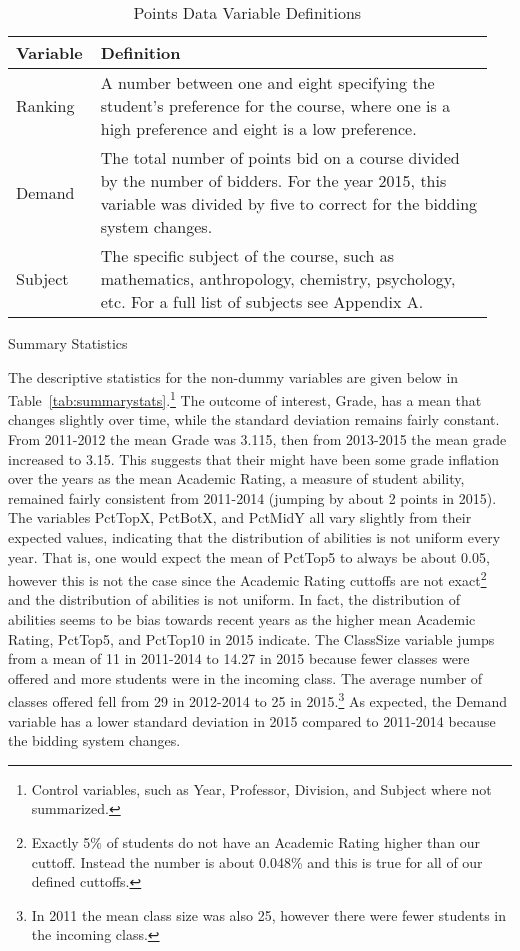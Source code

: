 \documentclass[12pt,a4paper,english,fleqn]{article}
\makeatletter
\newcommand{\tablelabel}[1]{Table~\ref{#1}}
\renewcommand\subsection{\@startsection{subsection}{2}
{\z@}{-3.25ex\@plus -1ex \@minus -.2ex}{1.5ex \@plus .2ex}{\normalfont\bf}}
\makeatother
\begin{document}
\begin{table}[htb]
  \centering
  \caption{Points Data Variable Definitions}\label{tab:def2}
  \begin{tabular}{|p{0.15\linewidth}|p{0.8\linewidth}|} 
    \hline\hline
    Variable & Definition \\ [0.5ex] 
    \hline\hline
    Ranking & A number between one and eight specifying the student's preference for the course, where one is a high preference and eight is a low preference. \\ 
    \hline
    Demand & The total number of points bid on a course divided by the number of bidders. For the year 2015, this variable was divided by five to correct for the bidding system changes.\\
    \hline
    Subject & The specific subject of the course, such as mathematics, anthropology, chemistry, psychology, etc. For a full list of subjects see Appendix A. \\
    [1ex] 
    \hline\hline
  \end{tabular}
\end{table}

\subsection{Summary Statistics}\label{summarystats}

The descriptive statistics for the non-dummy variables are given below in \tablelabel{tab:summarystats}.\footnote{Control variables, such as Year, Professor, Division, and Subject where not summarized.} 
The outcome of interest, Grade, has a mean that changes slightly over time, while the standard deviation remains fairly constant. 
From 2011-2012 the mean Grade was 3.115, then from 2013-2015 the mean grade increased to 3.15. 
This suggests that their might have been some grade inflation over the years as the mean Academic Rating, a measure of student ability, remained fairly consistent from 2011-2014 (jumping by about 2 points in 2015). 
The variables PctTopX, PctBotX, and PctMidY all vary slightly from their expected values, indicating that the distribution of abilities is not uniform every year. 
That is, one would expect the mean of PctTop5 to always be about 0.05, however this is not the case since the Academic Rating cuttoffs are not exact\footnote{Exactly 5\% of students do not have an Academic Rating higher than our cuttoff. Instead the number is about 0.048\% and this is true for all of our defined cuttoffs.} and the distribution of abilities is not uniform. 
In fact, the distribution of abilities seems to be bias towards recent years as the higher mean Academic Rating, PctTop5, and PctTop10 in 2015 indicate. 
The ClassSize variable jumps from a mean of 11 in 2011-2014 to 14.27 in 2015 because fewer classes were offered and more students were in the incoming class.
The average number of classes offered fell from 29 in 2012-2014 to 25 in 2015.\footnote{In 2011 the mean class size was also 25, however there were fewer students in the incoming class.}
As expected, the Demand variable has a lower standard deviation in 2015 compared to 2011-2014 because the bidding system changes. 
\end{document}
